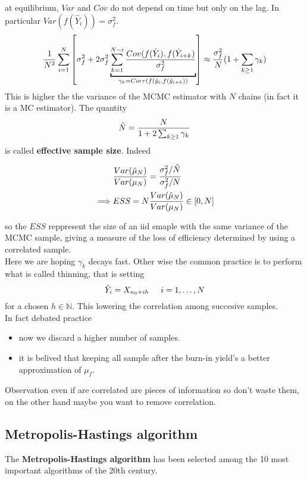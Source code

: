 \documentclass{article}
\begin{document}
	at equilibrium, $Var$ and $Cov$ do not depend on time but only on the lag.  In particular $Var(f(\hat{Y}_i))= \sigma_f^2$. 
	\begin{equation*}
		\frac{1}{N^2}  \sum_{i=1}^N \left[\sigma_f^2 + 2 \sigma_f^2\underbracket{\sum_{k=1}^{N-i}\frac{Cov(f(\hat{Y}_i),f(\hat{Y}_{i+k} )}{\sigma_f^2}}_{\mathclap{\gamma_k=Corr\left(f(\hat{y}_i,f(\hat{y}_{i+k})\right)}}\right] \approx \frac{\sigma_f^2}{N}(1+\sum_{k\geq 1}\gamma_k)
	\end{equation*}
	This is higher the the variance of the MCMC estimator with $N$ chains (in fact it is a MC estimator). The quantity 
	\begin{equation*}
		\Tilde{N} = \frac{N}{1 +2\sum_{k\geq 1}\gamma_k }
	\end{equation*}
	is called \textbf{effective sample size}. Indeed
	
	\begin{align*}
		&\frac{Var(\hat{\mu}_N)}{Var(\mu_N)} = \frac{\sigma_f^2/\Tilde{N}}{\sigma_f^2/N} \\
		\implies &ESS= N \frac{Var(\hat{\mu}_N)}{Var(\mu_N)}  \in [0,N] 
	\end{align*}
	
	so the $ESS$ reppresent the size of an iid smaple with the same variance of the MCMC sample, giving a measure of the loss of efficiency determined by using a correlated sample. \\
	Here we are hoping $\gamma_k$ decays fast. Other wise the common practice is to perform what is called thinning, that is setting 
	\begin{equation*}
		\hat{Y}_i = X_{n_0+ih } \hspace{0.5 cm} i = 1, \dots, N
	\end{equation*}
	for a chosen $h \in \mathbb{N}$. This lowering the correlation among succesive samples. \\
	In fact debated practice 
	\begin{itemize}
		\item now we discard a higher number of samples.
		\item it is belived that keeping all sample after the burn-in yield's a better approximation of $\mu_f$.
	\end{itemize}
	Observation even if are correlated are pieces of information so don't waste them, on the other hand maybe you want to remove correlation. 
	\subsection{Metropolis-Hastings algorithm}
	The \textbf{Metropolis-Hastings algorithm} has been selected among the 10 most important algorithms of the 20th century. 
	
\end{document}

